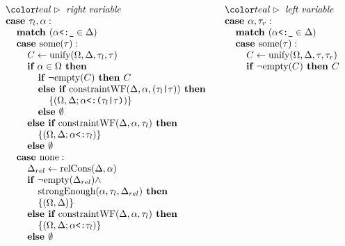 \documentclass[acmsmall]{acmart}
\begin{document}
\begin{figure*}[h]
\[\begin{array}[t]{@{} l}
    \I \C{right variable}
    \\
    \I \B{case } \tau_l, \alpha : 
    \\
    \I\I \B{match } (\code{$\alpha$<:\_} \in \Delta)
    \\
    \I\I \B{case } \F{some}(\tau) :
    \\
    \I\I\I C \leftarrow \F{unify}(\Omega, \Delta, \tau_l, \tau)
    \\
    \I\I\I \B{if } \alpha \in \Omega \B{ then }
    \\
    \I\I\I\I \B{if } \neg \F{empty}(C) \B{ then } C
    \\
    \I\I\I\I \B{else if } \F{constraintWF}(\Delta, \alpha, (\code{$\tau_l$|$\tau$})) \B{ then }
    \\
    \I\I\I\I\I \{(\Omega, \Delta;\code{$\alpha$<:($\tau_l$|$\tau$)})\}
    \\
    \I\I\I\I \B{else } \emptyset 
    \\
    \I\I\I \B{else if } \F{constraintWF}(\Delta, \alpha, \tau_l) \B{ then }
    \\
    \I\I\I\I \{(\Omega, \Delta;\code{$\alpha$<:$\tau_l$})\}
    \\
    \I\I\I \B{else } \emptyset 
    \\
    \I\I \B{case } \F{none} :
    \\
    \I\I\I \Delta_{rel} \leftarrow \F{relCons}(\Delta, \alpha)  
    \\
    \I\I\I \B{if } \neg \F{empty}(\Delta_{rel}) \wedge 
    \\
    \I\I\I\I \F{strongEnough}(\alpha, \tau_l, \Delta_{rel}) \B{ then }
    \\
    \I\I\I\I \{(\Omega, \Delta)\}
    \\
    \I\I\I \B{else if } \F{constraintWF}(\Delta, \alpha, \tau_l) \B{ then }
    \\
    \I\I\I\I \{(\Omega, \Delta;\code{$\alpha$<:$\tau_l$})\}
    \\
    \I\I\I \B{else } \emptyset 
\end{array}
\begin{array}[t]{@{} l}
  \I \C{left variable}
  \\
  \I \B{case } \alpha, \tau_r : 
  \\
  \I\I \B{match } (\code{$\alpha$<:\_} \in \Delta)
  \\
  \I\I \B{case } \F{some}(\tau) :
  \\
  \I\I\I C \leftarrow \F{unify}(\Omega, \Delta, \tau, \tau_r)
  \\
  \I\I\I \B{if } \neg \F{empty}(C) \B{ then } C

\end{array}\]
\end{figure*}
\end{document}
